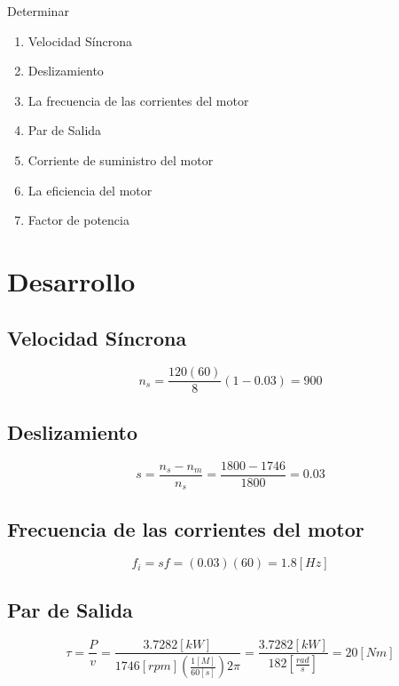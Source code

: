 \documentclass[]{article}
\begin{document}
Determinar

\begin{enumerate}
	\item Velocidad Síncrona
	\item Deslizamiento
	\item La frecuencia de las corrientes del motor
	\item Par de Salida
	\item Corriente de suministro del motor
	\item La eficiencia del motor
	\item Factor de potencia
\end{enumerate}

\section{Desarrollo}

\subsection{Velocidad Síncrona}


\begin{equation}
  n_s=\frac{120(60)}{8}(1-0.03)=900
  \label{ns}
\end{equation}

\subsection{Deslizamiento}


\begin{equation}
s=\frac{n_s-n_m}{n_s}=\frac{1800-1746}{1800}=0.03
\end{equation}

\subsection{Frecuencia de las corrientes del motor}

\begin{equation}
f_i=sf=(0.03)(60)=1.8[Hz]
\end{equation}

\subsection{Par de Salida}

\begin{equation}
 \tau=\frac{P}{v}=\frac{3.7282[kW]}{1746[rpm](\frac{1[M]}{60[s]})2 \pi}=\frac{3.7282[kW]}{182[\frac{rad}{s}]}=20[Nm]
\end{equation}
\end{document}

